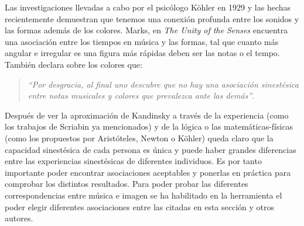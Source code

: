 Las investigaciones llevadas a cabo por el psicólogo Köhler en 1929 \cite{GestaltPsychology} y las hechas recientemente demuestran que tenemos una conexión profunda entre los sonidos y las formas además de los colores. Marks, en \emph{The Unity of the Senses} \cite{TheUnityOfTheSenses} encuentra una asociación entre los tiempos en música y las formas, tal que cuanto más angular e irregular es una figura más rápidas deben ser las notas o el tempo. También declara sobre los colores que:
\begin{quote}
\emph{``Por desgracia, al final uno descubre que no hay una asociación sinestésica entre notas musicales y colores que prevalezca ante las demás''}.\\
\end{quote}

Después de ver la aproximación de Kandinsky a través de la experiencia (como los trabajos de Scriabin ya mencionados) y de la lógica o las matemáticas-físicas (como los propuestos por Aristóteles, Newton o Köhler) queda claro que la capacidad sinestésica de cada persona es única y puede haber grandes diferencias entre las experiencias sinestésicas de diferentes individuos. Es por tanto importante poder encontrar asociaciones aceptables y ponerlas en práctica para comprobar los distintos resultados. Para poder probar las diferentes correspondencias entre música e imagen se ha habilitado en la herramienta el poder elegir diferentes asociaciones entre las citadas en esta sección y otros autores.